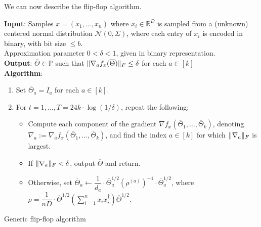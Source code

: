 \documentclass[aos]{imsart}
\theoremstyle{definition}
\numberwithin{equation}{section}
\DeclarePairedDelimiter{\norm}{\lVert}{\rVert}
\newcommand{\R}{{\mathbb{R}}}
\newcommand{\otheta}{\overline{\Theta}}
\newcommand{\eps}{\varepsilon}
\newcommand{\cN}{\mathcal{N}}
\newcommand{\SPD}{\mathbb{P}}
\newcommand{\samp}{x}
\def\dmax{d_{\max}}
\begin{document}
We can now describe the flip-flop algorithm.


\begin{Algorithm}
\textbf{Input}: Samples $\samp = (\samp_1, \ldots, \samp_n)$ where $\samp_i \in \R^D$ is sampled from a (unknown) centered normal distribution $\cN(0, \Sigma)$, where each entry of $\samp_i$ is encoded in binary, with bit size $\le b$. \\ Approximation parameter $0 < \delta < 1$, given in binary representation. \\[.3ex]

\textbf{Output}: $\otheta \in \SPD$ such that $\norm{\nabla_a f_x(\otheta)}_F \leq \delta$ for each $a \in [k]$ \\[.3ex]

\textbf{Algorithm}:
\begin{enumerate}
\item\label{it:flip-flop step 1} Set $\otheta_a = I_a$ for each $a \in [k]$. 

\vspace{5pt}

\item\label{it:flip-flop step 2} For $t=1,\dots,T = 24 k \cdot \log(1/\delta)$, repeat the following:

\vspace{5pt}

\begin{itemize}
\item Compute each component of the gradient $\nabla f_{\samp}(\otheta_1, \ldots, \otheta_k)$, denoting $\nabla_a := \nabla_a f_{\samp}(\otheta_1, \ldots, \otheta_k)$, and find the index $a \in [k]$ for which $\norm{\nabla_a}_F$ is largest.

\vspace{5pt}

\item
If $\norm{\nabla_a}_F < \delta$, output $\otheta$ and return.

\vspace{5pt}

\item Otherwise, set $\otheta_a \leftarrow  \dfrac{1}{d_a} \cdot \otheta_a^{1/2} (\rho^{(a)})^{-1} \cdot \otheta_a^{1/2}$, where $\rho = \dfrac{1}{nD} \cdot  \otheta^{1/2} \left( \sum_{i=1}^n x_ix_i^\dagger \right) \otheta^{1/2}.$
\end{itemize}
\end{enumerate}
\caption{Generic flip-flop algorithm}\label{alg:flip-flop}
\end{Algorithm}
\end{document}
